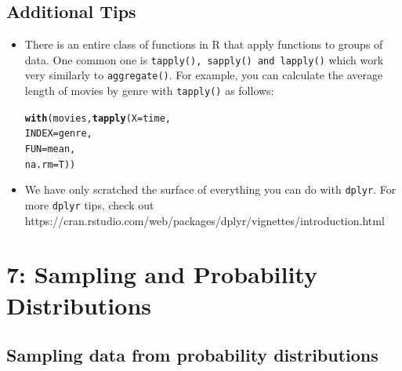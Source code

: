 \documentclass{tufte-book}\usepackage[]{graphicx}\usepackage[]{color}
\makeatletter
\newcommand{\hlstd}[1]{\textcolor[rgb]{0.345,0.345,0.345}{#1}}%
\newcommand{\hlkwc}[1]{\textcolor[rgb]{0.333,0.667,0.333}{#1}}%
\newcommand{\hlkwd}[1]{\textcolor[rgb]{0.737,0.353,0.396}{\textbf{#1}}}%
\newenvironment{kframe}{%
 \def\at@end@of@kframe{}%
 \ifinner\ifhmode%
  \def\at@end@of@kframe{\end{minipage}}%
  \begin{minipage}{\columnwidth}%
 \fi\fi%
 \def\FrameCommand##1{\hskip\@totalleftmargin \hskip-\fboxsep
 \colorbox{shadecolor}{##1}\hskip-\fboxsep
     \hskip-\linewidth \hskip-\@totalleftmargin \hskip\columnwidth}%
 \MakeFramed {\advance\hsize-\width
   \@totalleftmargin\z@ \linewidth\hsize
   \@setminipage}}%
 {\par\unskip\endMakeFramed%
 \at@end@of@kframe}
\newenvironment{knitrout}{}{} %
\makeatother
\begin{document}
\section{Additional Tips}

\begin{itemize}

  \item There is an entire class of functions in R that apply functions to groups of data. One common one is \texttt{tapply(), sapply() and lapply()} which work very similarly to \texttt{aggregate()}. For example, you can calculate the average length of movies by genre with \texttt{tapply()} as follows:

\begin{knitrout}
\color{fgcolor}\begin{kframe}
\begin{alltt}
\hlkwd{with}\hlstd{(movies,} \hlkwd{tapply}\hlstd{(}\hlkwc{X} \hlstd{= time,}
                    \hlkwc{INDEX} \hlstd{= genre,}
                    \hlkwc{FUN} \hlstd{= mean,}
                    \hlkwc{na.rm} \hlstd{= T))}
\end{alltt}
\end{kframe}
\end{knitrout}

  \item We have only scratched the surface of everything you can do with \texttt{dplyr}. For more \texttt{dplyr} tips, check out https://cran.rstudio.com/web/packages/dplyr/vignettes/introduction.html

\end{itemize}






\chapter{7: Sampling and Probability Distributions}
\label{ch:8}



\section{Sampling data from probability distributions}
\end{document}
